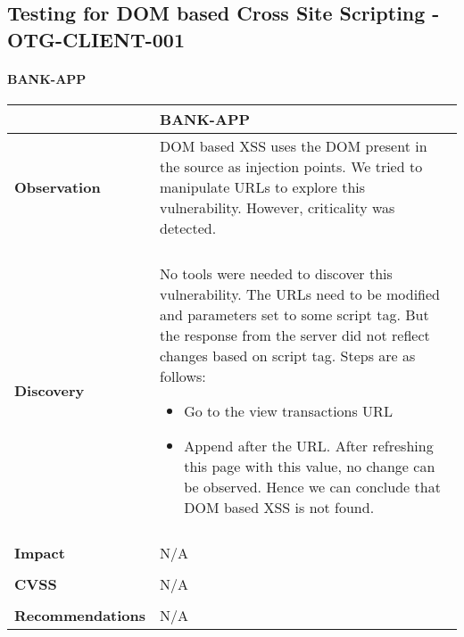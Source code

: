 \subsection{Testing for DOM based Cross Site Scripting - OTG-CLIENT-001}
\paragraph{BANK-APP} \mbox{}
\begin{longtable*}{p{.30\textwidth} | p{.70\textwidth}}
    \hline
    & \textbf{BANK-APP} \\
    \hline
    \textbf{Observation} &
      DOM based XSS uses the DOM present in the source as injection points. We tried to manipulate URLs to explore this vulnerability. However, criticality was detected.
    \\\\
    \textbf{Discovery} &
        No tools were needed to discover this vulnerability. The URLs need to be modified and parameters set to some script tag. But the response from the server did not reflect changes based on script tag. Steps are as follows:
        \begin{itemize}
        \item  Go to the view transactions URL 
        
        \item Append  after the URL. After refreshing this page with this value, no change can be observed. Hence we can conclude that DOM based XSS is not found.
        \end{itemize}
    \\\\
    \textbf{Impact} &
        N/A
    \\\\
    \textbf{CVSS} &
       N/A
    \\\\
    \textbf{Recommendations} &
       N/A\\
    \hline
\end{longtable*}
\clearpage

